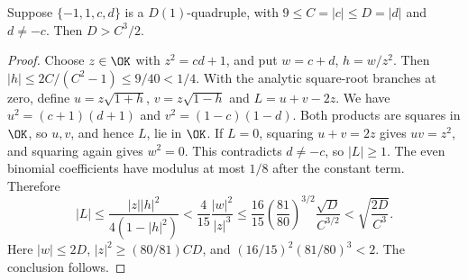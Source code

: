 \begin{lemma}\label{sm:five-unit-cubic}
Suppose $\{-1,1,c,d\}$ is a $D(1)$-quadruple, with
$9\le C=|c|\le D=|d|$ and $d\ne-c$. Then $D>C^3/2$.
\end{lemma}
\begin{proof}
Choose $z\in\OK$ with $z^2=cd+1$, and put $w=c+d$, $h=w/z^2$.
Then $|h|\le2C/(C^2-1)\le9/40<1/4$.
With the analytic square-root branches at zero, define
$u=z\sqrt{1+h}$, $v=z\sqrt{1-h}$ and $L=u+v-2z$.
We have $u^2=(c+1)(d+1)$ and $v^2=(1-c)(1-d)$.
Both products are squares in $\OK$, so $u,v$, and hence $L$, lie in $\OK$.
If $L=0$, squaring $u+v=2z$ gives $uv=z^2$, and squaring again gives
$w^2=0$. This contradicts $d\ne-c$, so $|L|\ge1$.
The even binomial coefficients have modulus at most $1/8$ after the
constant term. Therefore
\[
 |L|\le\frac{|z||h|^2}{4(1-|h|^2)}
 <\frac4{15}\frac{|w|^2}{|z|^3}
 \le\frac{16}{15}\left(\frac{81}{80}\right)^{3/2}
       \frac{\sqrt D}{C^{3/2}}
 <\sqrt{\frac{2D}{C^3}}.
\]
Here $|w|\le2D$, $|z|^2\ge(80/81)CD$, and
$(16/15)^2(81/80)^3<2$. The conclusion follows.
\end{proof}


